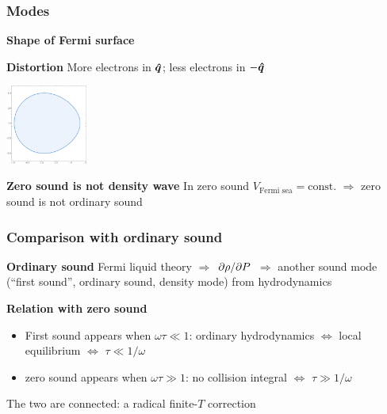 \documentclass{beamer}
\begin{document}
\begin{frame}
\frametitle{Modes}

\textbf{Shape of Fermi surface}

\begin{center}
    
\end{center}

\textbf{Distortion} More electrons in $\vu*{q}$; less electrons in $- \vu*{q}$

\begin{center}
    \includegraphics[width=0.2\textwidth]{spatial/zero-sound-l-0.png}
\end{center}

\textbf{Zero sound is not density wave} In zero sound $V_{\text{Fermi sea}} = \text{const}.$
$\Rightarrow$ zero sound is not ordinary sound

\end{frame}

\begin{frame}
\frametitle{Comparison with ordinary sound}

\textbf{Ordinary sound} Fermi liquid theory $\Rightarrow$ $\pdv*{\rho}{P}$ $\Rightarrow$
another sound mode (``first sound'', ordinary sound, density mode) from hydrodynamics

\vspace{0.5cm}

\textbf{Relation with zero sound} 
\begin{itemize}
    \item First sound appears when $\omega \tau \ll 1$:
    ordinary hydrodynamics $\Leftrightarrow$ local equilibrium $\Leftrightarrow$ $\tau \ll 1 / \omega$
    \item zero sound appears when $\omega \tau \gg 1$: 
    no collision integral $\Leftrightarrow$ $\tau \gg 1 / \omega$
\end{itemize}

The two are connected: a radical finite-$T$ correction

\begin{center}
    
\end{center}    

\end{frame}
\end{document}
